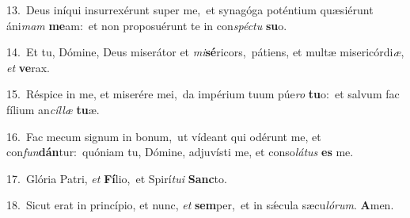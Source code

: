 {\numbfont\textcolor{\numbcolor}{13.}}~Deus iníqui insurrexérunt super me,~\dagger et synagóga poténtium quæsiérunt áni\textit{mam} \textbf{me}\-am:~\star et non proposuérunt te in con\-\textit{spéc}\-\textit{tu} \textbf{su}\-o.\par
{\numbfont\textcolor{\numbcolor}{14.}}~Et tu, Dómine, Deus miserátor et \textit{mi}\-\textbf{sé}ricors,~\star pátiens, et multæ misericórdi\-\textit{æ}\-, \textit{et} \textbf{ve}\-rax.\par
{\numbfont\textcolor{\numbcolor}{15.}}~Réspice in me, et miserére mei,~\dagger da impérium tuum púe\textit{ro} \textbf{tu}\-o:~\star et salvum fac fílium an\-\textit{cíl}\-\textit{læ} \textbf{tu}\-æ.\par
{\numbfont\textcolor{\numbcolor}{16.}}~Fac mecum signum in bonum,~\dagger ut vídeant qui odérunt me, et con\-\textit{fun}\-\textbf{dán}tur:~\star quóniam tu, Dómine, adjuvísti me, et conso\-\textit{lá}\-\textit{tus} \textbf{es} me.\par
{\numbfont\textcolor{\numbcolor}{17.}}~Glória Patri, \textit{et} \textbf{Fí}\-lio,~\star et Spirí\-\textit{tu}\-\textit{i} \textbf{Sanc}\-to.\par
{\numbfont\textcolor{\numbcolor}{18.}}~Sicut erat in princípio, et nunc, \textit{et} \textbf{sem}\-per,~\star et in sǽcula sæcu\-\textit{ló}\-\textit{rum}. \textbf{A}\-men.\par
